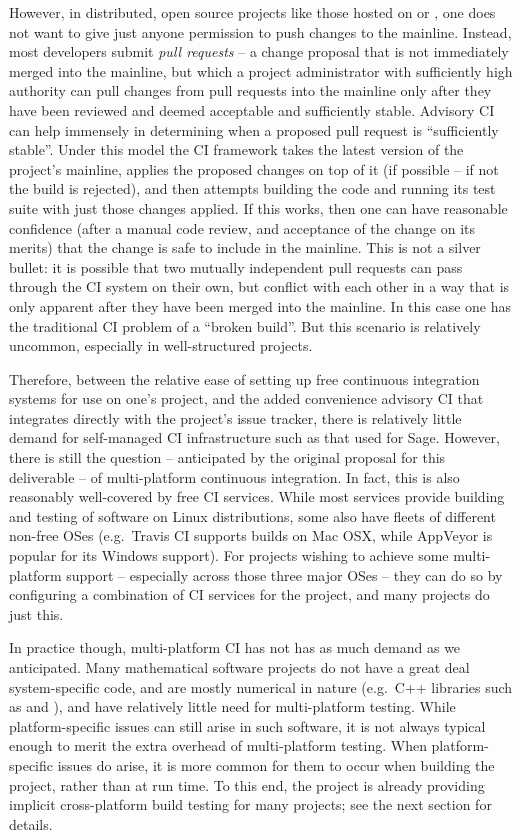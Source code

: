 \documentclass{deliverablereport}
\begin{document}
However, in distributed, open source projects like those hosted on \GitHub or
\GitLab, one does not want to give just anyone permission to push changes to
the mainline.  Instead, most developers submit {\em pull requests} -- a change
proposal that is not immediately merged into the mainline, but which a project
administrator with sufficiently high authority can pull changes from pull
requests into the mainline only after they have been reviewed and deemed
acceptable and sufficiently stable.  Advisory CI can help immensely in
determining when a proposed pull request is ``sufficiently stable''.  Under
this model the CI framework takes the latest version of the project's mainline,
applies the proposed changes on top of it (if possible -- if not the build is
rejected), and then attempts building the code and running its test suite with
just those changes applied.  If this works, then one can have reasonable
confidence (after a manual code review, and acceptance of the change on its
merits) that the change is safe to include in the mainline.  This is not a
silver bullet: it is possible that two mutually independent pull requests can
pass through the CI system on their own, but conflict with each other in a way
that is only apparent after they have been merged into the mainline.  In this
case one has the traditional CI problem of a ``broken build''.  But this
scenario is relatively uncommon, especially in well-structured projects.

Therefore, between the relative ease of setting up free continuous integration
systems for use on one's project, and the added convenience advisory CI that
integrates directly with the project's issue tracker, there is relatively
little demand for self-managed CI infrastructure such as that used for Sage.
However, there is still the question -- anticipated by the original proposal
for this deliverable -- of multi-platform continuous integration.  In fact,
this is also reasonably well-covered by free CI services.  While most services
provide building and testing of software on Linux distributions, some also have
fleets of different non-free OSes (e.g.~Travis CI supports builds on Mac OSX,
while AppVeyor is popular for its Windows support).  For projects wishing to
achieve some multi-platform support -- especially across those three major OSes
-- they can do so by configuring a combination of CI services for the project,
and many projects do just this.

In practice though, multi-platform CI has not has as much demand as we
anticipated.  Many mathematical software projects do not have a great deal
system-specific code, and are mostly numerical in nature (e.g.~C++ libraries
such as \Linbox and \Givaro), and have relatively little need for
multi-platform testing.  While platform-specific issues can still arise in such
software, it is not always typical enough to merit the extra overhead of
multi-platform testing.  When platform-specific issues do arise, it is more
common for them to occur when building the project, rather than at run time.
To this end, the \Sage project is already providing implicit cross-platform
build testing for many projects; see the next section for details.
\end{document}

